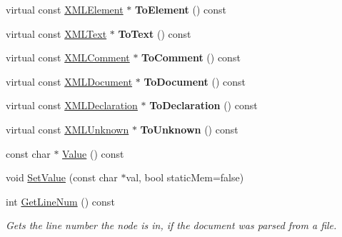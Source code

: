 \begin{DoxyCompactItemize}
\mbox{\label{classtinyxml2_1_1XMLNode_a2c5c843b8f37306f15994ebe882b9346}} 
virtual const \mbox{\hyperlink{classtinyxml2_1_1XMLElement}{X\+M\+L\+Element}} $\ast$ {\bfseries To\+Element} () const
\item 
\mbox{\label{classtinyxml2_1_1XMLNode_acb9ccc1beda27c0efcb0545683c3e7f4}} 
virtual const \mbox{\hyperlink{classtinyxml2_1_1XMLText}{X\+M\+L\+Text}} $\ast$ {\bfseries To\+Text} () const
\item 
\mbox{\label{classtinyxml2_1_1XMLNode_a6a53bb83faf5c0ccc95b6cf74dba0025}} 
virtual const \mbox{\hyperlink{classtinyxml2_1_1XMLComment}{X\+M\+L\+Comment}} $\ast$ {\bfseries To\+Comment} () const
\item 
\mbox{\label{classtinyxml2_1_1XMLNode_ae8a5250331a5f12e10843fcb5ef3ef0b}} 
virtual const \mbox{\hyperlink{classtinyxml2_1_1XMLDocument}{X\+M\+L\+Document}} $\ast$ {\bfseries To\+Document} () const
\item 
\mbox{\label{classtinyxml2_1_1XMLNode_ac48bb4bf9eb7bb3654ad4b94945db9a1}} 
virtual const \mbox{\hyperlink{classtinyxml2_1_1XMLDeclaration}{X\+M\+L\+Declaration}} $\ast$ {\bfseries To\+Declaration} () const
\item 
\mbox{\label{classtinyxml2_1_1XMLNode_af29ffd6cbe609b6fa04a705256150408}} 
virtual const \mbox{\hyperlink{classtinyxml2_1_1XMLUnknown}{X\+M\+L\+Unknown}} $\ast$ {\bfseries To\+Unknown} () const
\item 
const char $\ast$ \mbox{\hyperlink{classtinyxml2_1_1XMLNode_a66344989a4b436155bcda72bd6b07b82}{Value}} () const
\item 
void \mbox{\hyperlink{classtinyxml2_1_1XMLNode_a09dd68cf9eae137579f6e50f36487513}{Set\+Value}} (const char $\ast$val, bool static\+Mem=false)
\item 
\mbox{\label{classtinyxml2_1_1XMLNode_a9b5fc636646fda761d342c72e91cb286}} 
int \mbox{\hyperlink{classtinyxml2_1_1XMLNode_a9b5fc636646fda761d342c72e91cb286}{Get\+Line\+Num}} () const
\begin{DoxyCompactList}\small\item\em Gets the line number the node is in, if the document was parsed from a file. \end{DoxyCompactList}\item 

\end{DoxyCompactItemize}
